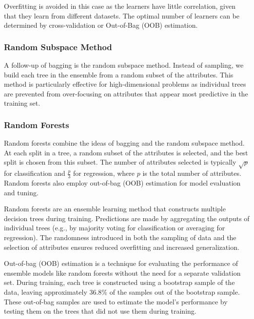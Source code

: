 Overfitting is avoided in this case as the learners have little
correlation, given that they learn from different datasets. The optimal
number of learners can be determined by cross-validation or Out-of-Bag (OOB)
estimation.

\subsubsection{Random Subspace Method}

A follow-up of bagging is the random subspace method. Instead of
sampling, we build each tree in the ensemble from a random subset of
the attributes. This method is particularly effective for
high-dimensional problems
as individual trees are prevented from over-focusing on attributes
that appear most
predictive in the training set.

\subsubsection{Random Forests}

Random forests combine the ideas of bagging and the random subspace method.
At each split in a tree, a random subset of the attributes is
selected, and the best
split is chosen from this subset. The number of attributes selected is typically
$\sqrt{p}$ for classification and $\frac{p}{3}$ for regression, where
$p$ is the total
number of attributes. Random forests also employ out-of-bag (OOB) estimation for
model evaluation and tuning.

\begin{definition}
  Random forests are an ensemble learning method that constructs
  multiple decision
  trees during training. Predictions are made by aggregating the
  outputs of individual
  trees (e.g., by majority voting for classification or averaging for
  regression).
  The randomness introduced in both the sampling of data and the selection of
  attributes ensures reduced overfitting and increased generalization.
\end{definition}

\begin{definition}
  Out-of-bag (OOB) estimation is a technique for evaluating the performance of
  ensemble models like random forests without the need for a separate
  validation set.
  During training, each tree is constructed using a bootstrap sample
  of the data, leaving
  approximately $36.8\%$ of the samples out of the bootstrap sample.
  These out-of-bag
  samples are used to estimate the model's performance by testing
  them on the trees
  that did not use them during training.
\end{definition}

